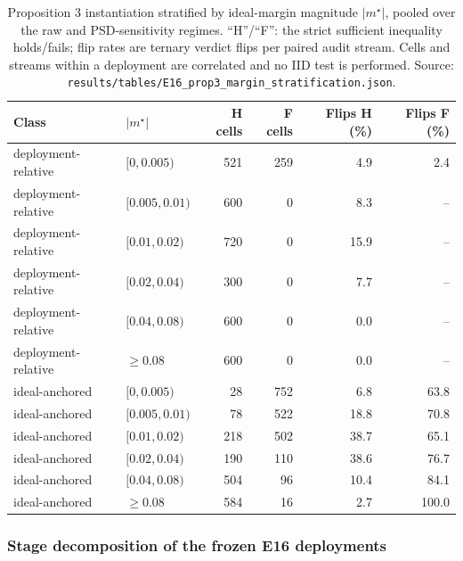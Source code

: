 \documentclass[11pt,a4paper]{article}
\begin{document}
\begin{table}[H]
\centering
\small
\setlength{\tabcolsep}{4pt}
\caption{Proposition 3 instantiation stratified by ideal-margin magnitude
$|m^\star|$, pooled over the raw and PSD-sensitivity regimes. ``H''/``F'': the
strict sufficient inequality holds/fails; flip rates are ternary verdict flips
per paired audit stream. Cells and streams within a deployment are correlated
and no IID test is performed. Source:
\texttt{results/tables/E16\_prop3\_margin\_stratification.json}.}
\label{tab:prop3-stratification}
\begin{tabular}{llrrrr}
\toprule
Class & $|m^\star|$ & H cells & F cells & Flips H (\%) & Flips F (\%) \\
\midrule
deployment-relative & $[0,0.005)$ & 521 & 259 & 4.9 & 2.4 \\
deployment-relative & $[0.005,0.01)$ & 600 & 0 & 8.3 & -- \\
deployment-relative & $[0.01,0.02)$ & 720 & 0 & 15.9 & -- \\
deployment-relative & $[0.02,0.04)$ & 300 & 0 & 7.7 & -- \\
deployment-relative & $[0.04,0.08)$ & 600 & 0 & 0.0 & -- \\
deployment-relative & $\geq0.08$ & 600 & 0 & 0.0 & -- \\
ideal-anchored & $[0,0.005)$ & 28 & 752 & 6.8 & 63.8 \\
ideal-anchored & $[0.005,0.01)$ & 78 & 522 & 18.8 & 70.8 \\
ideal-anchored & $[0.01,0.02)$ & 218 & 502 & 38.7 & 65.1 \\
ideal-anchored & $[0.02,0.04)$ & 190 & 110 & 38.6 & 76.7 \\
ideal-anchored & $[0.04,0.08)$ & 504 & 96 & 10.4 & 84.1 \\
ideal-anchored & $\geq0.08$ & 584 & 16 & 2.7 & 100.0 \\
\bottomrule
\end{tabular}
\end{table}

\subsubsection{Stage decomposition of the frozen E16 deployments}
\label{sec:stage-decomposition}
\end{document}
